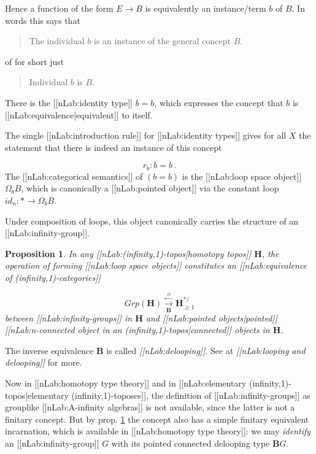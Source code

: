 \documentclass[12pt,titlepage]{article}
\theoremstyle{plain}
\newtheorem{prop}{Proposition}
\theoremstyle{definition}
\theoremstyle{remark}
\begin{document}
Hence a function of the form $E \longrightarrow B$ is equivalently an instance/term $b$ of $B$. In words this says that

\begin{quote}%
The individual $b$ is an instance of the general concept $B$.


\end{quote}
of for short just

\begin{quote}%
Individual $b$ is $B$.


\end{quote}
There is the [[nLab:identity type]] $b = b$, which expresses the concept that $b$ is [[nLab:equivalence|equivalent]] to itself.

The single [[nLab:introduction rule]] for [[nLab:identity types]] gives for all $X$ the statement that there is indeed an instance of this concept

\begin{displaymath}
r_b \colon b = b
  \,.
\end{displaymath}
The [[nLab:categorical semantics]] of $(b = b)$ is the [[nLab:loop space object]] $\Omega_b B$, which is canonically a [[nLab:pointed object]] via the constant loop $id_n \colon \ast \to \Omega_b B$.

Under composition of loops, this object canonically carries the structure of an [[nLab:infinity-group]].

\begin{prop}
\label{LoopingDeloopingTheorem}\hypertarget{LoopingDeloopingTheorem}{}
In any [[nLab:(infinity,1)-topos|homotopy topos]] $\mathbf{H}$, the operation of forming [[nLab:loop space objects]] constitutes an [[nLab:equivalence of (infinity,1)-categories]]

\begin{displaymath}
Grp(\mathbf{H})
   \stackrel{\overset{\Omega}{\longleftarrow}}{\underset{\mathbf{B}}{\longrightarrow}}
  \mathbf{H}^{\ast/}_{\geq 1}
\end{displaymath}
between [[nLab:infinity-groups]] in $\mathbf{H}$ and [[nLab:pointed objects|pointed]] [[nLab:n-connected object in an (infinity,1)-topos|connected]] objects in $\mathbf{H}$.

\end{prop}
The inverse equivalence $\mathbf{B}$ is called \emph{[[nLab:delooping]]}. See at \emph{[[nLab:looping and delooping]]} for more.

Now in [[nLab:homotopy type theory]] and in [[nLab:elementary (infinity,1)-topos|elementary (infinity,1)-toposes]], the definition of [[nLab:infinity-groups]] as grouplike [[nLab:A-infinity algebras]] is not available, since the latter is not a finitary concept. But by prop. \ref{LoopingDeloopingTheorem} the concept also has a simple finitary equivalent incarnation, which is available in [[nLab:homotopy type theory]]: we may \emph{identify} an [[nLab:infinity-group]] $G$ with its pointed connected delooping type $\mathbf{B}G$.
\end{document}
